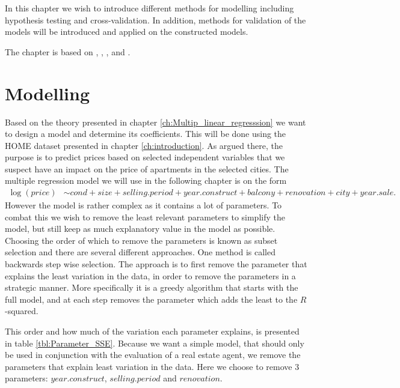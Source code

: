 In this chapter we wish to introduce different methods for modelling including hypothesis testing and cross-validation.
In addition, methods for validation of the models will be introduced and applied on the constructed models.

The chapter is based on \cite{Allison2012}, \cite{MadsenThyregod2011}, \cite{Hoeg2016}, \cite{Wooldridge2012} and \cite{Hastie2008}.

\section{Modelling} \label{sec:modelling}
Based on the theory presented in chapter \ref{ch:Multip_linear_regresssion} we want to design a model and determine its coefficients. 
This will be done using the HOME dataset presented in chapter \ref{ch:introduction}. 
As argued there, the purpose is to predict prices based on selected independent variables that we suspect have an impact on the price of apartments in the selected cities.
The multiple regression model we will use in the following chapter is on the form
\begin{align*}
    \log(\textit{price}) &\sim \textit{cond} + \textit{size} + \textit{selling.period} + \textit{year.construct} + \textit{balcony} + \textit{renovation} + \textit{city} + \textit{year.sale}.
\end{align*}
However the model is rather complex as it contains a lot of parameters.
To combat this we wish to remove the least relevant parameters to simplify the model, but still keep as much explanatory value in the model as possible.
Choosing the order of which to remove the parameters is known as subset selection and there are several different approaches.
One method is called backwards step wise selection. 
The approach is to first remove the parameter that explains the least variation in the data, in order to remove the parameters in a strategic manner.
More specifically it is a greedy algorithm that starts with the full model, and at each step removes the parameter which adds the least to the $R$-squared.

This order and how much of the variation each parameter explains, is presented in table \ref{tbl:Parameter_SSE}.
Because we want a simple model, that should only be used in conjunction with the evaluation of a real estate agent, we remove the parameters that explain least variation in the data. 
Here we choose to remove 3 parameters: $year.construct$, $selling.period$ and $renovation$. 

